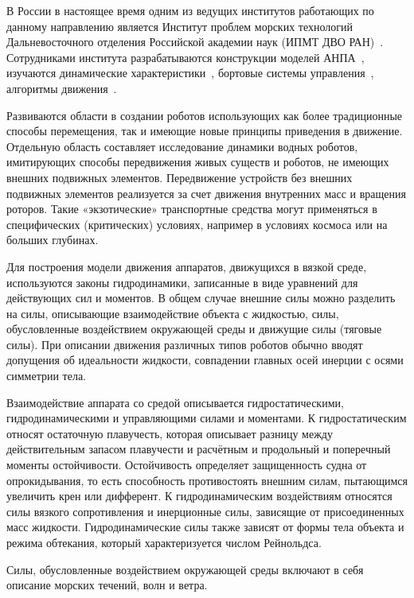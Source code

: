 В России в настоящее время одним из ведущих институтов работающих по данному направлению является Институт проблем морских технологий Дальневосточного отделения Российской академии наук (ИПМТ ДВО РАН)~\cite{Ageev, Kiselev_2012, Inzarcev_2018_book}. Сотрудниками института разрабатываются конструкции моделей АНПА~\cite{Boreyko_2011, Iznarcev_2007}, изучаются динамические характеристики~\cite{Kiselev_2012}, бортовые системы управления~\cite{Iznarcev_2005}, алгоритмы движения~\cite{Kiselev_2004}.



Развиваются области в создании роботов использующих как более традиционные способы перемещения, так и имеющие новые принципы приведения в движение. Отдельную область составляет исследование динамики водных роботов, имитирующих способы передвижения живых существ и роботов, не имеющих внешних подвижных элементов. Передвижение устройств без внешних подвижных элементов реализуется за счет движения внутренних масс и вращения роторов. Такие «экзотические» транспортные средства могут применяться в специфических (критических) условиях, например в условиях космоса или на больших глубинах.

Для построения модели движения аппаратов, движущихся в вязкой среде, используются законы гидродинамики, записанные в виде уравнений для действующих сил и моментов. В общем случае внешние силы можно разделить на силы, описывающие взаимодействие объекта с жидкостью, силы, обусловленные воздействием окружающей среды и движущие силы (тяговые силы). При описании движения различных типов роботов обычно вводят допущения об идеальности жидкости, совпадении главных осей инерции с осями симметрии тела.

Взаимодействие аппарата со средой описывается гидростатическими, гидродинамическими и управляющими силами и моментами. К гидростатическим относят остаточную плавучесть, которая описывает разницу между действительным запасом плавучести и расчётным и продольный и поперечный моменты остойчивости. Остойчивость определяет защищенность судна от опрокидывания, то есть способность противостоять внешним силам, пытающимся увеличить крен или дифферент. К гидродинамическим воздействиям относятся силы вязкого сопротивления и инерционные силы, зависящие от присоединенных масс жидкости. Гидродинамические силы также зависят от формы тела объекта и режима обтекания, который характеризуется числом Рейнольдса.

Силы, обусловленные воздействием окружающей среды включают в себя описание морских течений, волн и ветра.

